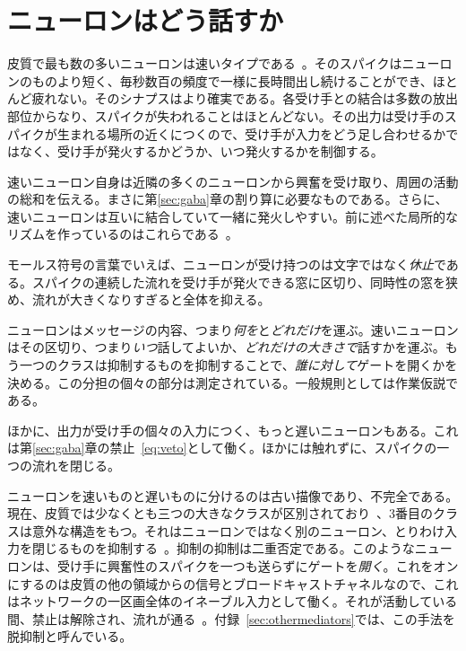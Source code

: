\section{ニューロンはどう話すか}

皮質で最も数の多いニューロンは速いタイプである~\cite{Tremblay2016}。そのスパイクはニューロンのものより短く、毎秒数百の頻度で一様に長時間出し続けることができ、ほとんど疲れない。そのシナプスはより確実である。各受け手との結合は多数の放出部位からなり、スパイクが失われることはほとんどない。その出力は受け手のスパイクが生まれる場所の近くにつくので、受け手が入力をどう足し合わせるかではなく、受け手が発火するかどうか、いつ発火するかを制御する。

速いニューロン自身は近隣の多くのニューロンから興奮を受け取り、周囲の活動の総和を伝える。まさに第\ref{sec:gaba}章の割り算に必要なものである。さらに、速いニューロンは互いに結合していて一緒に発火しやすい。前に述べた局所的なリズムを作っているのはこれらである~\cite{Cardin2009}。

モールス符号の言葉でいえば、ニューロンが受け持つのは文字ではなく\emph{休止}である。スパイクの連続した流れを受け手が発火できる窓に区切り、同時性の窓を狭め、流れが大きくなりすぎると全体を抑える。

\begin{keyblock}
\begin{proposition}[役割の分担]
\label{prop:punctuation}
ニューロンはメッセージの内容、つまり\emph{何を}と\emph{どれだけ}を運ぶ。速いニューロンはその区切り、つまり\emph{いつ}話してよいか、\emph{どれだけの大きさで}話すかを運ぶ。もう一つのクラスは抑制するものを抑制することで、\emph{誰に対して}ゲートを開くかを決める。この分担の個々の部分は測定されている。一般規則としては作業仮説である。
\end{proposition}
\end{keyblock}

ほかに、出力が受け手の個々の入力につく、もっと遅いニューロンもある。これは第\ref{sec:gaba}章の禁止~\eqref{eq:veto}として働く。ほかには触れずに、スパイクの一つの流れを閉じる。

ニューロンを速いものと遅いものに分けるのは古い描像であり、不完全である。現在、皮質では少なくとも三つの大きなクラスが区別されており~\cite{Tremblay2016}、3番目のクラスは意外な構造をもつ。それはニューロンではなく別のニューロン、とりわけ入力を閉じるものを抑制する~\cite{Pfeffer2013}。抑制の抑制は二重否定である。このようなニューロンは、受け手に興奮性のスパイクを一つも送らずにゲートを\emph{開く}。これをオンにするのは皮質の他の領域からの信号とブロードキャストチャネルなので、これはネットワークの一区画全体のイネーブル入力として働く。それが活動している間、禁止は解除され、流れが通る~\cite{Pi2013}。付録~\ref{sec:othermediators}では、この手法を脱抑制と呼んでいる。
